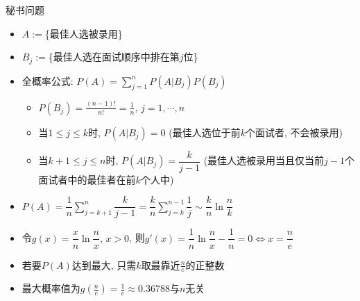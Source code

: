 \begin{frame}{秘书问题}
		\begin{itemize}[<+-|alert@+>]
			\item $A:=$\{最佳人选被录用\}%
			\item$B_j:=$\{最佳人选在面试顺序中排在第$j$位\}
			\item 全概率公式: $P(A)=\sum\limits_{j=1}^{n}P(A|B_j)P(B_j)$%
			\begin{itemize}[<+-|alert@+>]
			\item $P(B_j)=\frac{(n-1)!}{n!}=\frac{1}{n},\,j=1,\cdots,n$
			\item 当$1\leq j\leq k$时, $P(A|B_j)=0$ \pause (最佳人选位于前$k$个面试者, 不会被录用)\pause
			\item 当$k+1\leq j\leq n$时, $P(A|B_j)=\dfrac{k}{j-1}$ (最佳人选被录用当且仅当前$j-1$个面试者中的最佳者在前$k$个人中)
			\end{itemize}
			\item $P(A)=\dfrac{1}{n}\sum\limits_{j=k+1}^{n}\dfrac{k}{j-1}=\dfrac{k}{n}\sum\limits_{j=k}^{n-1}\dfrac{1}{j}\sim\dfrac{k}{n}\ln\dfrac{n}{k}$
			\item 令$g(x)=\dfrac{x}{n}\ln\dfrac{n}{x},\,x>0$, 则$g'(x)=\dfrac{1}{n}\ln\dfrac{n}{x}-\dfrac{1}{n}=0\Longleftrightarrow x=\dfrac{n}{e}$
			\item 若要$P(A)$达到最大, 只需$k$取最靠近$\frac{n}{e}$的正整数
			\item 最大概率值为$g\left(\frac{n}{e}\right)=\frac{1}{e}\approx 0.36788$与$n$无关
		\end{itemize}
\end{frame}










